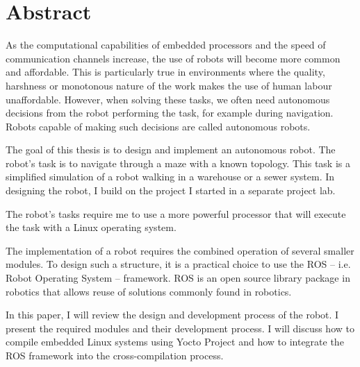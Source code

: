 \chapter*{Abstract}

As the computational capabilities of embedded processors and the speed of
communication channels increase, the use of robots will become more common and
affordable. This is particularly true in environments where the quality,
harshness or monotonous nature of the work makes the use of human labour
unaffordable. However, when solving these tasks, we often need autonomous
decisions from the robot performing the task, for example during
navigation. Robots capable of making such decisions are called autonomous robots.

The goal of this thesis is to design and implement an autonomous robot. The
robot's task is to navigate through a maze with a known topology. This task is a
simplified simulation of a robot walking in a warehouse or a sewer system. In
designing the robot, I build on the project I started in a separate project lab.

The robot's tasks require me to use a more powerful processor that will execute
the task with a Linux operating system.

The implementation of a robot requires the combined operation of several smaller
modules. To design such a structure, it is a practical choice to use the ROS --
i.e. Robot Operating System -- framework. ROS is an open source library package
in robotics that allows reuse of solutions commonly found in robotics.

In this paper, I will review the design and development process of the robot. I
present the required modules and their development process. I will discuss how to
compile embedded Linux systems using Yocto Project and how to integrate the ROS
framework into the cross-compilation process.

\vfill
\selectthesislanguage

\setcounter{romanPage}{\value{page}}
